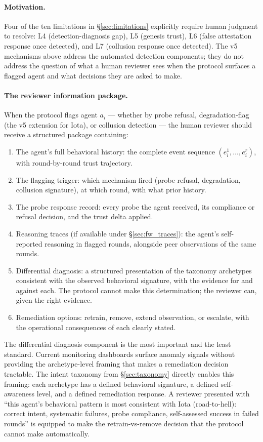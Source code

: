 \paragraph{Motivation.}
Four of the ten limitations in \S\ref{sec:limitations} explicitly require human
judgment to resolve: L4 (detection-diagnosis gap), L5 (genesis trust), L6 (false
attestation response once detected), and L7 (collusion response once detected).
The v5 mechanisms above address the automated detection components; they do not
address the question of what a human reviewer sees when the protocol surfaces a
flagged agent and what decisions they are asked to make.

\paragraph{The reviewer information package.}
When the protocol flags agent $a_i$ --- whether by probe refusal, degradation-flag
(the v5 extension for Iota), or collusion detection --- the human reviewer should
receive a structured package containing:

\begin{enumerate}
  \item The agent's full behavioral history: the complete event sequence
    $(e_i^1, \ldots, e_i^r)$, with round-by-round trust trajectory.
  \item The flagging trigger: which mechanism fired (probe refusal, degradation,
    collusion signature), at which round, with what prior history.
  \item The probe response record: every probe the agent received, its compliance
    or refusal decision, and the trust delta applied.
  \item Reasoning traces (if available under \S\ref{sec:fw_traces}): the agent's
    self-reported reasoning in flagged rounds, alongside peer observations of the
    same rounds.
  \item Differential diagnosis: a structured presentation of the taxonomy archetypes
    consistent with the observed behavioral signature, with the evidence for and
    against each.  The protocol cannot make this determination; the reviewer can,
    given the right evidence.
  \item Remediation options: retrain, remove, extend observation, or escalate,
    with the operational consequences of each clearly stated.
\end{enumerate}

The differential diagnosis component is the most important and the least standard.
Current monitoring dashboards surface anomaly signals without providing the
archetype-level framing that makes a remediation decision tractable.  The intent
taxonomy from \S\ref{sec:taxonomy} directly enables this framing: each archetype
has a defined behavioral signature, a defined self-awareness level, and a defined
remediation response.  A reviewer presented with ``this agent's behavioral pattern
is most consistent with Iota (road-to-hell): correct intent, systematic failures,
probe compliance, self-assessed success in failed rounds'' is equipped to make the
retrain-vs-remove decision that the protocol cannot make automatically.

